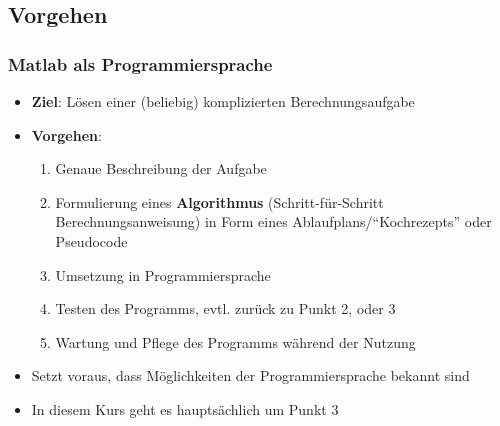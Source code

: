   \subsection{Vorgehen}
  \begin{frame}
      \frametitle{Matlab als Programmiersprache}
      \begin{itemize}
          \item \textbf{Ziel}: Lösen einer (beliebig) komplizierten Berechnungsaufgabe
          \item \textbf{Vorgehen}:
          \begin{enumerate}
              \item Genaue Beschreibung der Aufgabe
              \item Formulierung eines \textbf{Algorithmus} (Schritt-für-Schritt Berechnungsanweisung) in Form eines Ablaufplans/``Kochrezepts'' oder Pseudocode
              \item Umsetzung in Programmiersprache
              \item Testen des Programms, evtl. zurück zu Punkt 2, oder 3
              \item Wartung und Pflege des Programms während der Nutzung
          \end{enumerate}
          \item Setzt voraus, dass Möglichkeiten der Programmiersprache bekannt sind
          \item In diesem Kurs geht es hauptsächlich um Punkt 3
      \end{itemize}
  \end{frame}


